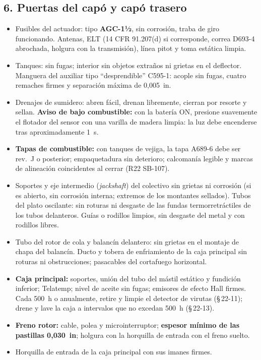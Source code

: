 \subsection*{6. Puertas del capó y capó trasero}
\begin{itemize}
\item Fusibles del actuador: tipo \textbf{AGC-1½}, sin corrosión, traba de giro funcionando. Antenas, ELT (14 CFR 91.207(d) si corresponde, correa D693-4 abrochada, holgura con la transmisión), línea pitot y toma estática limpia.
\item Tanques: sin fugas; interior sin objetos extraños ni grietas en el deflector. Manguera del auxiliar tipo ``desprendible'' C595-1: acople sin fugas, cuatro remaches firmes y separación máxima de 0,005~in.
\item Drenajes de sumidero: abren fácil, drenan libremente, cierran por resorte y sellan. \textbf{Aviso de bajo combustible:} con la batería ON, presione suavemente el flotador del sensor con una varilla de madera limpia: la luz debe encenderse tras aproximadamente 1~s.
\item \textbf{Tapas de combustible:} con tanques de vejiga, la tapa A689-6 debe ser rev.~J o posterior; empaquetadura sin deterioro; calcomanía legible y marcas de alineación coincidentes al cerrar (R22 SB-107).
\item Soportes y eje intermedio (\emph{jackshaft}) del colectivo sin grietas ni corrosión (si es abierto, sin corrosión interna; extremos de los montantes sellados). Tubos del plato oscilante: sin roturas ni desgaste de las fundas termorretráctiles de los tubos delanteros. Guías o rodillos limpios, sin desgaste del metal y con rodillos libres.
\item Tubo del rotor de cola y balancín delantero: sin grietas en el montaje de chapa del balancín. Ducto y tobera de enfriamiento de la caja principal sin roturas ni obstrucciones; pasacables del cortafuego horizontal.
\item \textbf{Caja principal:} soportes, unión del tubo del mástil estático y fundición inferior; Telatemp; nivel de aceite sin fugas; emisores de efecto Hall firmes. Cada 500~h o anualmente, retire y limpie el detector de virutas (\S\,22-11); drene y lave la caja a intervalos que no excedan 500~h (\S\,22-13).
\item \textbf{Freno rotor:} cable, polea y microinterruptor; \textbf{espesor mínimo de las pastillas 0,030~in}; holgura con la horquilla de entrada con el freno suelto.
\item Horquilla de entrada de la caja principal con sus imanes firmes.

\end{itemize}
